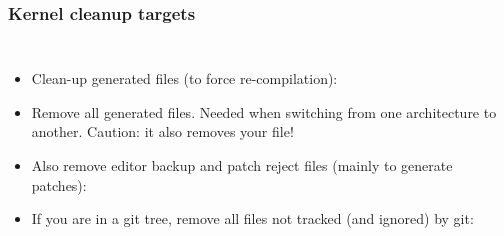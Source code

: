 \begin{frame}
  \frametitle{Kernel cleanup targets}
  \begin{columns}
    \begin{itemize}
    \item Clean-up generated files (to force re-compilation):\\
    \item Remove all generated files. Needed when switching from one
      architecture to another. Caution: it also removes your  file!\\
    \item Also remove editor backup and patch reject files (mainly to
      generate patches):\\
    \item If you are in a git tree, remove all files not tracked (and
      ignored) by git:\\
    \end{itemize}

\end{columns}
\end{frame}
